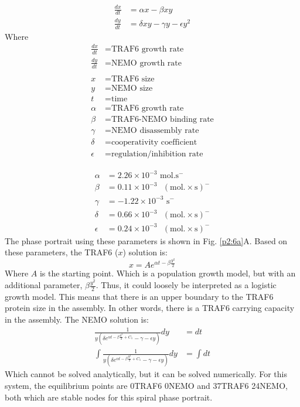 \begin{equation}
\begin{aligned}
\frac{dx}{dt} &= \alpha x - \beta xy \\
\frac{dy}{dt} &= \delta xy -\gamma y - \epsilon y^2 
\end{aligned}
\end{equation}
Where
\begin{equation}
\begin{aligned}
\frac{dx}{dt} &= \text{TRAF6 growth rate} \\
\frac{dy}{dt} &= \text{NEMO growth rate} \\
\\
x &= \text{TRAF6 size} \\
y &= \text{NEMO size} \\
t &= \text{time} \\
\alpha & = \text{TRAF6 growth rate} \\
\beta & = \text{TRAF6-NEMO binding rate} \\
\gamma & = \text{NEMO disassembly rate} \\
\delta & = \text{cooperativity coefficient} \\
\epsilon & = \text{regulation/inhibition rate}
\end{aligned}
\end{equation}

\begin{equation}
\begin{aligned}
\alpha &= 2.26\times 10^{-3} \text{ mol.} \text{s}^-\\
\beta &= 0.11\times 10^{-3} \text{ }(\text{mol.}\times \text{s})^-\\
\gamma &= -1.22\times 10^{-3} \text{ s}^-\\
\delta &= 0.66\times 10^{-3} \text{ } (\text{mol.}\times \text{s})^-\\ 
\epsilon &= 0.24\times 10^{-3} \text{ } (\text{mol.}\times \text{s})^- 
\end{aligned}
\end{equation}
The phase portrait using these parameters is shown in Fig. \ref{p2:6a}A. Based on these parameters, the TRAF6 ($x$) solution is:
\begin{equation}
x = A e^{\alpha t - \beta \frac{y^2}{2}}
\end{equation}
Where $A$ is the starting point. Which is a population growth model, but with an additional parameter, $\beta \frac{y^2}{2}$. Thus, it could loosely be interpreted as a logistic growth model. This means that there is an upper boundary to the TRAF6 protein size in the assembly. In other words, there is a TRAF6 carrying capacity in the assembly. The NEMO solution is:
\begin{align*}
\frac{1}{y(\delta e^{\alpha t - \beta\frac{y^2}{2} + C_1} - \gamma - \epsilon y)}dy &= dt \\
\int \frac{1}{y(\delta e^{\alpha t - \beta\frac{y^2}{2} + C_1} - \gamma - \epsilon y)}dy &= \int dt
\end{align*}
Which cannot be solved analytically, but it can be solved numerically. For this system, the equilibrium points are 0\times TRAF6 0\times NEMO and 37\times TRAF6 24\times NEMO, both which are stable nodes for this spiral phase portrait.

